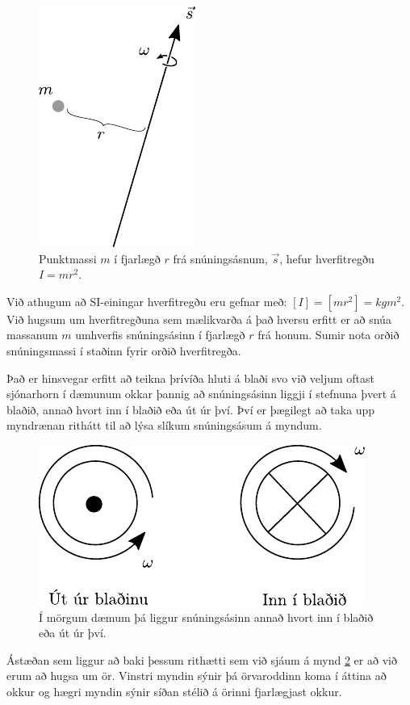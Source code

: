 \ifdefined \wholebook \else\documentclass[oneside]{book}\usepackage{EdlBook}\graphicspath{{figures/}}
\begin{document}
\begin{figure}[H]
    \centering
    \includegraphics[scale=1.2]{figures/hverfi.pdf}
    \caption{Punktmassi $m$ í fjarlægð $r$ frá snúningsásnum, $\vec{s}$, hefur hverfitregðu $I = mr^2$.}
    \label{fig:hverfi}
\end{figure}
Við athugum að SI-einingar hverfitregðu eru gefnar með: $[I] = [mr^2] = \si{kgm^2}$. Við hugsum um hverfitregðuna sem mælikvarða á það hversu erfitt er að snúa massanum $m$ umhverfis snúningsásinn í fjarlægð $r$ frá honum. Sumir nota orðið snúningsmassi í staðinn fyrir orðið hverfitregða.

Það er hinsvegar erfitt að teikna þrívíða hluti á blaði svo við veljum oftast sjónarhorn í dæmunum okkar þannig að snúningsásinn liggji í stefnuna þvert á blaðið, annað hvort inn í blaðið eða út úr því. Því er þægilegt að taka upp myndrænan rithátt til að lýsa slíkum snúningsásum á myndum.

\begin{figure}[H]
    \centering
    \includegraphics{figures/haegri.pdf}
    \caption{Í mörgum dæmum þá liggur snúningsásinn annað hvort inn í blaðið eða út úr því.}
    \label{fig:orvar}
\end{figure}

Ástæðan sem liggur að baki þessum rithætti sem við sjáum á mynd \ref{fig:orvar} er að við erum að hugsa um ör. Vinstri myndin sýnir þá örvaroddinn koma í áttina að okkur og hægri myndin sýnir síðan stélið á örinni fjarlægjast okkur.
\end{document}
